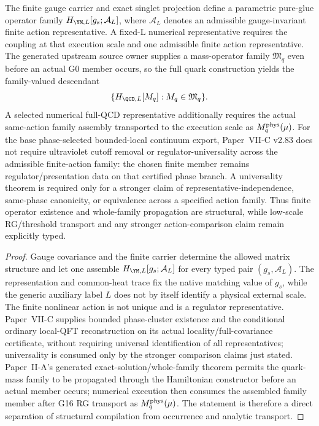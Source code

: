 \documentclass[12pt,a4paper]{article}
\begin{document}
\begin{theorem}
\label{p10:thm:finite-strong-hamiltonian-closed}
The finite gauge carrier and exact singlet projection define a parametric pure-glue operator family \(H_{\YM,L}[g_s;\mathcal A_L]\), where \(\mathcal A_L\) denotes an admissible gauge-invariant finite action representative.  A fixed-L numerical representative requires the coupling at that execution scale and one admissible finite action representative.  The generated upstream source owner supplies a mass-operator family \(\mathfrak M_q\) even before an actual G0 member occurs, so the full quark construction yields the family-valued descendant
\[
 \{H_{\QCD,L}[M_q]:M_q\in\mathfrak M_q\}.
\]
A selected numerical full-QCD representative additionally requires the actual same-action family assembly transported to the execution scale as \(M_q^{\rm phys}(\mu)\).  For the base phase-selected bounded-local continuum export, Paper~VII-C v2.83 does not require ultraviolet cutoff removal or regulator-universality across the admissible finite-action family: the chosen finite member remains regulator/presentation data on that certified phase branch.  A universality theorem is required only for a stronger claim of representative-independence, same-phase canonicity, or equivalence across a specified action family.  Thus finite operator existence and whole-family propagation are structural, while low-scale RG/threshold transport and any stronger action-comparison claim remain explicitly typed.
\end{theorem}
\begin{proof}
Gauge covariance and the finite carrier determine the allowed matrix structure and let one assemble \(H_{\YM,L}[g_s;\mathcal A_L]\) for every typed pair \((g_s,\mathcal A_L)\).  The representation and common-heat trace fix the native matching value of
\(g_s\), while the generic auxiliary label \(L\) does not by itself identify a
physical external scale.  The finite nonlinear action is not unique and is a regulator representative.  Paper~VII-C supplies bounded phase-cluster existence and the conditional
ordinary local-QFT reconstruction on its actual locality/full-covariance
certificate, without requiring universal identification of all representatives; universality is consumed only by the stronger comparison claims just stated.  Paper~II-A's generated exact-solution/whole-family theorem permits the quark-mass family to be propagated through the Hamiltonian constructor before an actual member occurs; numerical execution then consumes the assembled family member after G16 RG transport as \(M_q^{\rm phys}(\mu)\).  The statement is therefore a direct separation of structural compilation from occurrence and analytic transport.
\end{proof}
\end{document}
